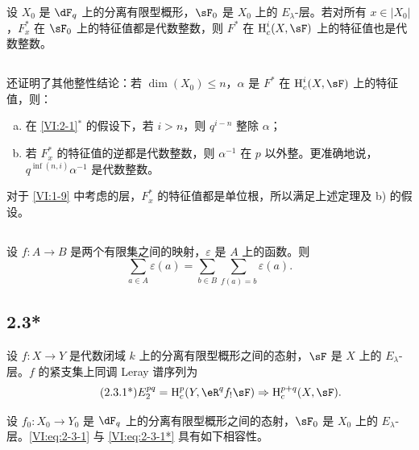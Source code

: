 \begin{theorem*}[2.1*]\label{VI:2-1*}
设 $X_0$ 是 $\dF_q$ 上的分离有限型概形，$\sF_0$ 是 $X_0$ 上的 $E_\lambda$-层。若对所有 $x\in |X_0|$，$F_x^\ast$ 在 $\sF_0$ 上的特征值都是代数整数，则 $F^\ast$ 在 $\h_c^i(X,\sF)$ 上的特征值也是代数整数。
\end{theorem*}

\subsection{}\label{VI:2-2}

\cite[XXI, 5.2.2 et 5.4]{sga7} 还证明了其他整性结论：若 $\dim(X_0)\leqslant n$，$\alpha$ 是 $F^\ast$ 在 $\h_c^i(X,\sF)$ 上的特征值，则：
\begin{enumerate}[a)]
  \item 在 \ref{VI:2-1}$^\ast$ 的假设下，若 $i>n$，则 $q^{i-n}$ 整除 $\alpha$；
  \item 若 $F_x^\ast$ 的特征值的逆都是代数整数，则 $\alpha^{-1}$ 在 $p$ 以外整。更准确地说，$q^{\inf(n,i)}\alpha^{-1}$ 是代数整数。
\end{enumerate}

对于 \ref{VI:1-9} 中考虑的层，$F_x^\ast$ 的特征值都是单位根，所以满足上述定理及 b) 的假设。

\subsection{}\label{VI:2-3}

设 $f:A\to B$ 是两个有限集之间的映射，$\varepsilon$ 是 $A$ 上的函数。则
\begin{equation*}\tag{2.3.1}\label{VI:eq:2-3-1}
  \sum_{a\in A} \varepsilon(a) = \sum_{b\in B} \sum_{f(a)=b} \varepsilon(a) \text{.}
\end{equation*}

\subsection*{2.3*}\label{VI:2-3*}

设 $f:X\to Y$ 是代数闭域 $k$ 上的分离有限型概形之间的态射，$\sF$ 是 $X$ 上的 $E_\lambda$-层。$f$ 的紧支集上同调 Leray 谱序列为
\begin{align*}\tag{2.3.1*}\label{VI:eq:2-3-1*}
  E_2^{p q} = \h_c^p(Y,\eR^q f_! \sF) \Rightarrow \h_c^{p+q}(X,\sF) \text{.}
\end{align*}

设 $f_0:X_0 \to Y_0$ 是 $\dF_q$ 上的分离有限型概形之间的态射，$\sF_0$ 是 $X_0$ 上的 $E_\lambda$-层。\eqref{VI:eq:2-3-1} 与 \eqref{VI:eq:2-3-1*} 具有如下相容性。

